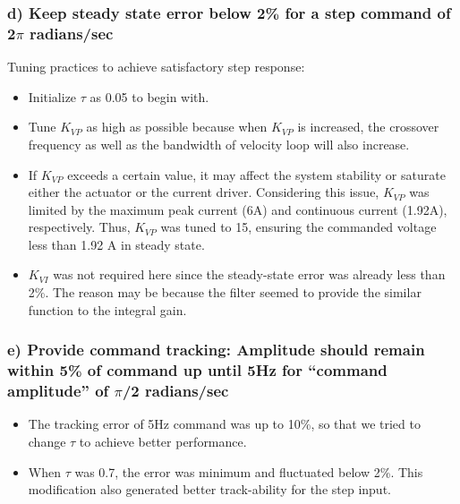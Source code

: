 \documentclass[letterpaper]{article}
\begin{document}
\subsubsection*{d) Keep steady state error below 2\% for a step command of 2$\pi$ radians/sec}
Tuning practices to achieve satisfactory step response:
\begin{itemize}
\item Initialize $\tau$ as 0.05 to begin with.
\item Tune $K_{VP}$ as high as possible because when $K_{VP}$ is increased, the crossover frequency as well as the bandwidth of velocity loop will also increase.
\item If $K_{VP}$ exceeds a certain value, it may affect the system stability or saturate either the actuator or the current driver. Considering this issue, $K_{VP}$ was limited by the maximum peak current (6A) and continuous current (1.92A), respectively. Thus, $K_{VP}$  was tuned to 15, ensuring the commanded voltage less than 1.92 A in steady state.  
\item $K_{VI}$ was not required here since the steady-state error was already less than 2\%. The reason may be because the filter seemed to provide the similar function to the integral gain.
\end{itemize}

\subsubsection*{e) Provide command tracking: Amplitude should remain within 5\% of command up until 5Hz for “command amplitude” of $\pi$/2 radians/sec}
\begin{itemize}
\item 	The tracking error of 5Hz command was up to 10\%, so that we tried to change $\tau$ to achieve better performance.
\item When $\tau$ was 0.7, the error was minimum and fluctuated below 2\%. This modification also generated better track-ability for the step input.
\end{itemize}
\end{document}
